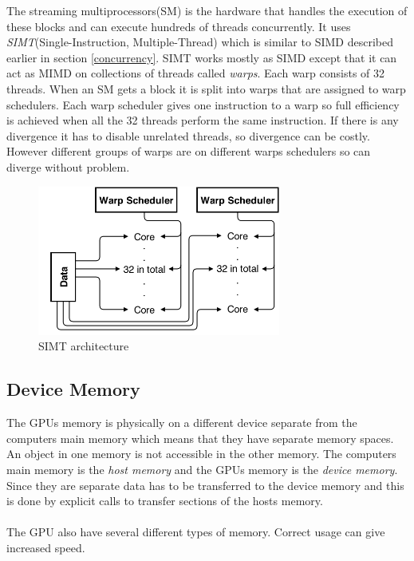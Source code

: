 \documentclass[10pt,a4paper]{report}
\begin{document}
The streaming multiprocessors(SM) is the hardware that handles the execution of these blocks and can execute hundreds of threads concurrently. It uses \emph{SIMT}(Single-Instruction, Multiple-Thread) which is similar to SIMD described earlier in section \ref{concurrency}. SIMT works mostly as SIMD except that it can act as MIMD on collections of threads called \emph{warps}. Each warp consists of 32 threads. When an SM gets a block it is split into warps that are assigned to warp schedulers. Each warp scheduler gives one instruction to a warp so full efficiency is achieved when all the 32 threads perform the same instruction. If there is any divergence it has to disable unrelated threads, so divergence can be costly. However different groups of warps are on different warps schedulers so can diverge without problem.\cite{cuda}

\begin{figure}[h]
    \centering
    \includegraphics[width=8cm]{SIMT.png}
    \caption{SIMT architecture}
    \label{fig:SIMT}
\end{figure}

\subsection{Device Memory}
The GPUs memory is physically on a different device separate from the computers main memory which means that they have separate memory spaces. An object in one memory is not accessible in the other memory. The computers main memory is the \emph{host memory} and the GPUs memory is the \emph{device memory}. Since they are separate data has to be transferred to the device memory and this is done by explicit calls to transfer sections of the hosts memory.\cite{cuda}\\
\\
The GPU also have several different types of memory\cite{cuda}. Correct usage can give increased speed\cite{cuda, cuda_best_practice}.
\end{document}
